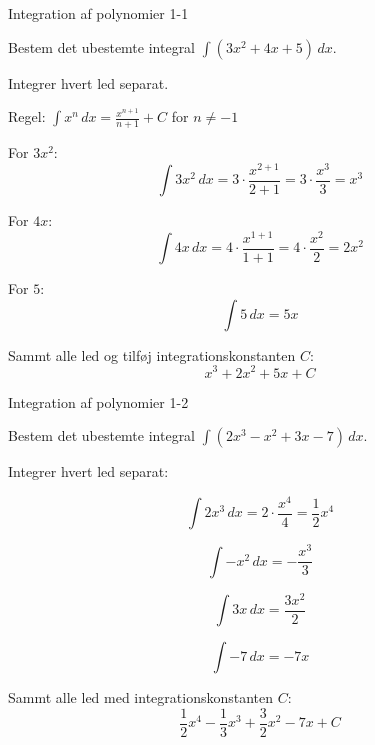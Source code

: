 \documentclass{article}
\begin{document}

\tableofcontents
\newpage

\begin{exercise}{Integration af polynomier 1-1}

Bestem det ubestemte integral $\int (3x^2 + 4x + 5) \, dx$.


\hint

Integrer hvert led separat.

\hint

Regel: $\int x^n \, dx = \frac{x^{n+1}}{n+1} + C$ for $n \neq -1$

\hint

For $3x^2$:
\[
\int 3x^2 \, dx = 3 \cdot \frac{x^{2+1}}{2+1} = 3 \cdot \frac{x^3}{3} = x^3 
\]

\hint

For $4x$:
\[
\int 4x \, dx = 4 \cdot \frac{x^{1+1}}{1+1} = 4 \cdot \frac{x^2}{2} = 2x^2 
\]

\hint

For $5$:
\[
\int 5 \, dx = 5x 
\]

\hint

Sammt alle led og tilføj integrationskonstanten $C$:
\[
x^3 + 2x^2 + 5x + C
\]

\end{exercise}

\newpage

\begin{exercise}{Integration af polynomier 1-2}

Bestem det ubestemte integral $\int (2x^3 - x^2 + 3x - 7) \, dx$.


\hint

Integrer hvert led separat:

\hint
\[
\int 2x^3 \, dx = 2 \cdot \frac{x^4}{4} = \frac{1}{2}x^4
\]

\hint
\[
\int -x^2 \, dx = -\frac{x^3}{3}
\]

\hint
\[
\int 3x \, dx = \frac{3x^2}{2}
\]

\hint
\[
\int -7 \, dx = -7x
\]

\hint

Sammt alle led med integrationskonstanten $C$:
\[
\frac{1}{2}x^4 - \frac{1}{3}x^3 + \frac{3}{2}x^2 - 7x + C
\]

\end{exercise}
\end{document}
